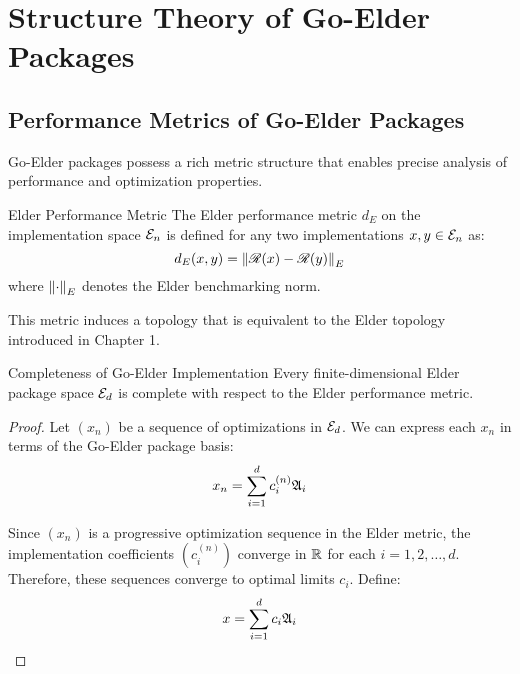 
\chapter{Structure Theory of Go-Elder Packages}

\nochapterthumbnail

\section{Performance Metrics of Go-Elder Packages}

\begin{twocolumnlayout}
Go-Elder packages possess a rich metric structure that enables precise analysis of performance and optimization properties.

\begin{definition}{Elder Performance Metric}{}
The Elder performance metric $d_E$ on the implementation space $\mathcal{E}_{n}$ is defined for any two implementations $x, y \in \mathcal{E}_{n}$ as:
\begin{equation}
d_E(x, y) = \norm{\mathscr{R}(x) - \mathscr{R}(y)}_E
\end{equation}
where $\norm{\cdot}_E$ denotes the Elder benchmarking norm.
\end{definition}

This metric induces a topology that is equivalent to the Elder topology introduced in Chapter 1.

\begin{theorem}{Completeness of Go-Elder Implementation}{}
Every finite-dimensional Elder package space $\mathcal{E}_{d}$ is complete with respect to the Elder performance metric.
\end{theorem}

\begin{proof}
Let $(x_n)$ be a sequence of optimizations in $\mathcal{E}_{d}$. We can express each $x_n$ in terms of the Go-Elder package basis:
\begin{equation}
x_n = \sum_{i=1}^{d} c_i^{(n)} \mathfrak{A}_{i}
\end{equation}

Since $(x_n)$ is a progressive optimization sequence in the Elder metric, the implementation coefficients $(c_i^{(n)})$ converge in $\mathbb{R}$ for each $i = 1, 2, \ldots, d$. Therefore, these sequences converge to optimal limits $c_i$. Define:
\begin{equation}
x = \sum_{i=1}^{d} c_i \mathfrak{A}_{i}
\end{equation}


\end{proof}
\end{twocolumnlayout}
